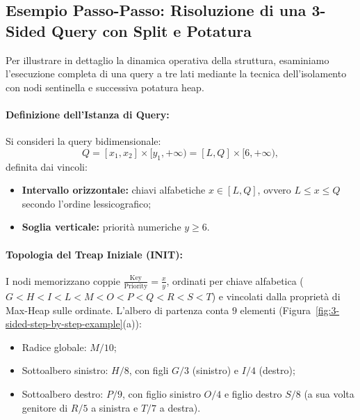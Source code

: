 \subsection{Esempio Passo-Passo: Risoluzione di una 3-Sided Query con Split e Potatura}
\label{sec:treap-3sided-example}

Per illustrare in dettaglio la dinamica operativa della struttura, esaminiamo l'esecuzione completa di una query a tre lati mediante la tecnica dell'isolamento con nodi sentinella e successiva potatura heap.

\paragraph{Definizione dell'Istanza di Query:}
Si consideri la query bidimensionale:
\begin{equation}
  Q = [x_1, x_2] \times [y_1, +\infty) = [L, Q] \times [6, +\infty),
\end{equation}
definita dai vincoli:
\begin{itemize}
    \item \textbf{Intervallo orizzontale:} chiavi alfabetiche $x \in [L, Q]$, ovvero $L \le x \le Q$ secondo l'ordine lessicografico;
    \item \textbf{Soglia verticale:} priorit\`a numeriche $y \ge 6$.
\end{itemize}

\paragraph{Topologia del Treap Iniziale (INIT):}
I nodi memorizzano coppie $\frac{\text{Key}}{\text{Priority}} = \frac{x}{y}$, ordinati per chiave alfabetica ($G < H < I < L < M < O < P < Q < R < S < T$) e vincolati dalla propriet\`a di Max-Heap sulle ordinate. L'albero di partenza conta $9$ elementi (Figura~\ref{fig:3-sided-step-by-step-example}(a)):
\begin{itemize}
    \item Radice globale: $M / 10$;
    \item Sottoalbero sinistro: $H / 8$, con figli $G / 3$ (sinistro) e $I / 4$ (destro);
    \item Sottoalbero destro: $P / 9$, con figlio sinistro $O / 4$ e figlio destro $S / 8$ (a sua volta genitore di $R / 5$ a sinistra e $T / 7$ a destra).
\end{itemize}

